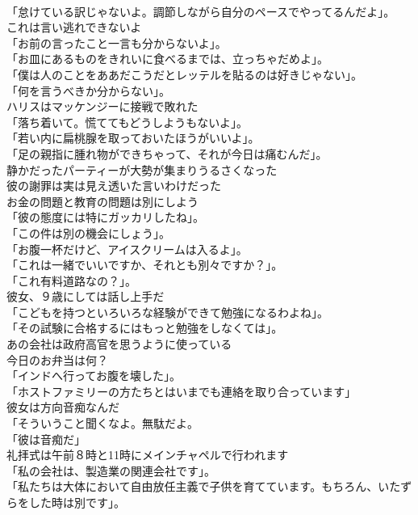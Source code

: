 \documentclass[8pt]{extreport}
\begin{document}
\begin{CJK}{UTF8}{min}
\\	「怠けている訳じゃないよ。調節しながら自分のペースでやってるんだよ」。	
\\	これは言い逃れできないよ	
\\	「お前の言ったこと一言も分からないよ」。	
\\	「お皿にあるものをきれいに食べるまでは、立っちゃだめよ」。	
\\	「僕は人のことをああだこうだとレッテルを貼るのは好きじゃない」。	
\\	「何を言うべきか分からない」。	
\\	ハリスはマッケンジーに接戦で敗れた	
\\	「落ち着いて。慌ててもどうしようもないよ」。	
\\	「若い内に扁桃腺を取っておいたほうがいいよ」。	
\\	「足の親指に腫れ物ができちゃって、それが今日は痛むんだ」。	
\\	静かだったパーティーが大勢が集まりうるさくなった	
\\	彼の謝罪は実は見え透いた言いわけだった	
\\	お金の問題と教育の問題は別にしよう	
\\	「彼の態度には特にガッカリしたね」。	
\\	「この件は別の機会にしょう」。	
\\	「お腹一杯だけど、アイスクリームは入るよ」。	
\\	「これは一緒でいいですか、それとも別々ですか？」。	
\\	「これ有料道路なの？」。	
\\	彼女、９歳にしては話し上手だ	
\\	「こどもを持つといろいろな経験ができて勉強になるわよね」。	
\\	「その試験に合格するにはもっと勉強をしなくては」。	
\\	あの会社は政府高官を思うように使っている	
\\	今日のお弁当は何？	
\\	「インドへ行ってお腹を壊した」。	
\\	「ホストファミリーの方たちとはいまでも連絡を取り合っています」	
\\	彼女は方向音痴なんだ	
\\	「そういうこと聞くなよ。無駄だよ。	
\\	「彼は音痴だ」	
\\	礼拝式は午前８時と11時にメインチャペルで行われます	
\\	「私の会社は、製造業の関連会社です」。	
\\	「私たちは大体において自由放任主義で子供を育てています。もちろん、いたずらをした時は別です」。	

\end{CJK}
\end{document}
